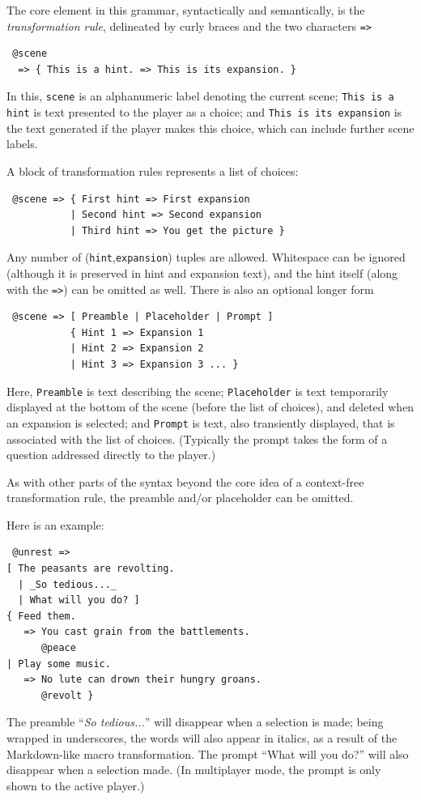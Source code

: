 \documentclass{acm_proc_article-sp}
\begin{document}
The core element in this grammar, syntactically and semantically, is the {\em transformation rule},
delineated by curly braces and the two characters {\tt =>}
\begin{verbatim}
 @scene
  => { This is a hint. => This is its expansion. }
\end{verbatim}
In this, {\tt scene} is an alphanumeric label denoting the current scene;
{\tt This is a hint} is text presented to the player as a choice;
and {\tt This is its expansion} is the text generated if the player makes this choice,
which can include further scene labels.

A block of transformation rules represents a list of choices:
\begin{verbatim}
 @scene => { First hint => First expansion
           | Second hint => Second expansion
           | Third hint => You get the picture }
\end{verbatim}
Any number of ({\tt hint},{\tt expansion}) tuples are allowed.
Whitespace can be ignored (although it is preserved in hint and expansion text),
and the hint itself (along with the {\tt =>}) can be omitted as well.
There is also an optional longer form
\begin{verbatim}
 @scene => [ Preamble | Placeholder | Prompt ]
           { Hint 1 => Expansion 1
           | Hint 2 => Expansion 2
           | Hint 3 => Expansion 3 ... }
\end{verbatim}

Here, {\tt Preamble} is text describing the scene;
{\tt Placeholder} is text temporarily displayed at the bottom of the scene (before the list of choices),
and deleted when an expansion is selected;
and {\tt Prompt} is text, also transiently displayed, that is associated with the list of choices.
(Typically the prompt takes the form of a question addressed directly to the player.)

As with other parts of the syntax beyond the core idea of a context-free transformation rule,
the preamble and/or placeholder can be omitted.

Here is an example:
\begin{verbatim}
 @unrest =>
[ The peasants are revolting. 
  | _So tedious..._ 
  | What will you do? ] 
{ Feed them.
   => You cast grain from the battlements.
      @peace
| Play some music.
   => No lute can drown their hungry groans.
      @revolt }
\end{verbatim}

The preamble ``{\em So tedious...}'' will disappear when a selection is made; being wrapped in underscores, the words will also appear in italics, as a result of the Markdown-like macro transformation.
The prompt ``What will you do?'' will also disappear when a selection made.
(In multiplayer mode, the prompt is only shown to the active player.)
\end{document}
